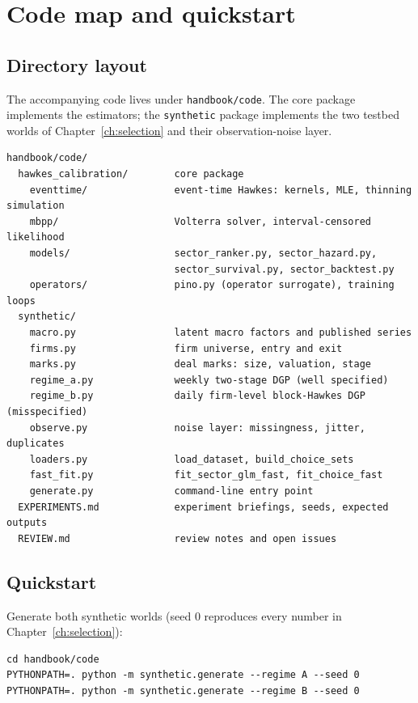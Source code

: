 \chapter{Code map and quickstart}
\label{app:code}

\section{Directory layout}\label{app:code-map}

The accompanying code lives under \texttt{handbook/code}. The core package implements the estimators; the
\texttt{synthetic} package implements the two testbed worlds of Chapter~\ref{ch:selection} and their
observation-noise layer.

\begin{verbatim}
handbook/code/
  hawkes_calibration/        core package
    eventtime/               event-time Hawkes: kernels, MLE, thinning simulation
    mbpp/                    Volterra solver, interval-censored likelihood
    models/                  sector_ranker.py, sector_hazard.py,
                             sector_survival.py, sector_backtest.py
    operators/               pino.py (operator surrogate), training loops
  synthetic/
    macro.py                 latent macro factors and published series
    firms.py                 firm universe, entry and exit
    marks.py                 deal marks: size, valuation, stage
    regime_a.py              weekly two-stage DGP (well specified)
    regime_b.py              daily firm-level block-Hawkes DGP (misspecified)
    observe.py               noise layer: missingness, jitter, duplicates
    loaders.py               load_dataset, build_choice_sets
    fast_fit.py              fit_sector_glm_fast, fit_choice_fast
    generate.py              command-line entry point
  EXPERIMENTS.md             experiment briefings, seeds, expected outputs
  REVIEW.md                  review notes and open issues
\end{verbatim}

\section{Quickstart}\label{app:code-quickstart}

Generate both synthetic worlds (seed 0 reproduces every number in Chapter~\ref{ch:selection}):

\begin{verbatim}
cd handbook/code
PYTHONPATH=. python -m synthetic.generate --regime A --seed 0
PYTHONPATH=. python -m synthetic.generate --regime B --seed 0
\end{verbatim}

